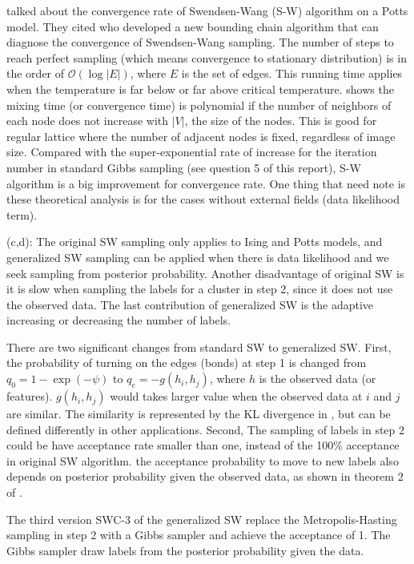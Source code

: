 \documentclass[12pt]{article}
\begin{document}
\citep{barbu2005generalizing} talked about the convergence rate of Swendsen-Wang
(S-W) algorithm on a Potts model. They cited \citet{huber2003bounding} who
developed a new bounding chain algorithm that can diagnose the convergence of
Swendsen-Wang sampling. The number of steps to reach perfect sampling (which
means convergence to stationary distribution) is in the order of
$\mathcal{O}(\log |E|)$, where $E$ is the set of edges. This running time
applies when the temperature is far below or far above critical
temperature. \citet{cooper1999mixing} shows the mixing time (or convergence
time) is polynomial if the number of neighbors of each node does not increase
with $|V|$, the size of the nodes. This is good for regular lattice where the
number of adjacent nodes is fixed, regardless of image size. Compared with the
super-exponential rate of increase for the iteration number in standard Gibbs
sampling (see question 5 of this report), S-W algorithm is a big improvement for
convergence rate. One thing that need note is these theoretical analysis is for
the cases without external fields (data likelihood term).

(c,d): The original SW sampling only applies to Ising and Potts models, and
generalized SW sampling can be applied when there is data likelihood and we seek
sampling from posterior probability. Another disadvantage of original SW is it is
slow when sampling the labels for a cluster in step 2, since it does not use the
observed data. The last contribution of generalized SW is the adaptive increasing
or decreasing the number of labels.

There are two significant changes from standard SW to generalized SW. First, the
probability of turning on the edges (bonds) at step 1 is changed from $q_0 = 1 -
\exp (-\psi)$ to $q_e = - g(h_i, h_j)$, where $h$ is the observed data (or
features). $g(h_i, h_j)$ would takes larger value when the observed data at $i$
and $j$ are similar. The similarity is represented by the KL divergence in
\citet{barbu2005generalizing}, but can be defined differently in other
applications.  Second, The sampling of labels in step 2 could be have
acceptance rate smaller than one, instead of the 100\% acceptance in original SW
algorithm. the acceptance probability to move to new labels also depends on
posterior probability given the observed data, as shown in theorem 2 of
\citeauthor{barbu2005generalizing}.

The third version SWC-3 of the generalized SW replace the Metropolis-Hasting
sampling in step 2 with a Gibbs sampler and achieve the acceptance of 1. The
Gibbs sampler draw labels from the posterior probability given the data.
\end{document}
